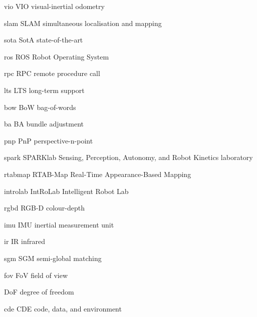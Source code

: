 \newacronym
    {vio}
    {VIO}
    {visual-inertial odometry}

\newacronym
    {slam}
    {SLAM}
    {simultaneous localisation and mapping}

\newacronym
    {sota}
    {SotA}
    {state-of-the-art}

\newacronym
    {ros}
    {ROS}
    {Robot Operating System}

\newacronym
    {rpc}
    {RPC}
    {remote procedure call}

\newacronym
    {lts}
    {LTS}
    {long-term support}

\newacronym
    {bow}
    {BoW}
    {bag-of-words}

\newacronym
    {ba}
    {BA}
    {bundle adjustment}

\newacronym
    {pnp}
    {PnP}
    {perspective-n-point}

\newacronym
    {spark}
    {SPARKlab}
    {Sensing, Perception, Autonomy, and Robot Kinetics laboratory}

\newacronym
    {rtabmap}
    {RTAB-Map}
    {Real-Time Appearance-Based Mapping}

\newacronym
    {introlab}
    {IntRoLab}
    {Intelligent Robot Lab}

\newacronym
    {rgbd}
    {RGB-D}
    {colour-depth}

\newacronym
    {imu}
    {IMU}
    {inertial measurement unit}

\newacronym
    {ir}
    {IR}
    {infrared}

\newacronym
    {sgm}
    {SGM}
    {semi-global matching}

\newacronym
    {fov}
    {FoV}
    {field of view}

    {DoF}
    {degree of freedom}

\newacronym
    {cde}
    {CDE}
    {code, data, and environment}

